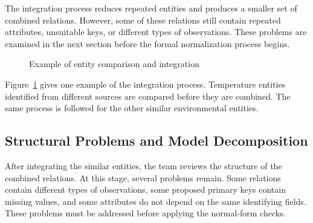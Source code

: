 The integration process reduces repeated entities and produces a smaller set
of combined relations. However, some of these relations still contain
repeated attributes, unsuitable keys, or different types of observations.
These problems are examined in the next section before the formal
normalization process begins.
\begin{figure}[H]
\centering


\caption{Example of entity comparison and integration}
\label{fig:entity-integration}
\end{figure}
Figure~\ref{fig:entity-integration} gives one example of the integration
process. Temperature entities identified from different sources are compared
before they are combined. The same process is followed for the other similar
environmental entities.

\subsection{Structural Problems and Model Decomposition}
\label{subsec:structural-decomposition}

After integrating the similar entities, the team reviews the structure of the
combined relations. At this stage, several problems remain. Some relations
contain different types of observations, some proposed primary keys contain
missing values, and some attributes do not depend on the same identifying
fields. These problems must be addressed before applying the normal-form
checks.


